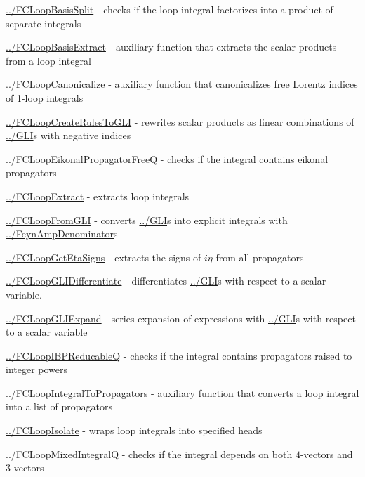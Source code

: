 \documentclass[../FeynCalcManual.tex]{subfiles}
\begin{document}
\begin{itemize}
{\item
  \hyperlink{../fcloopbasissplit}{../FCLoopBasisSplit} - checks if the
  loop integral factorizes into a product of separate integrals
\item
  \hyperlink{../fcloopbasisextract}{../FCLoopBasisExtract} - auxiliary
  function that extracts the scalar products from a loop integral
\item
  \hyperlink{../fcloopcanonicalize}{../FCLoopCanonicalize} - auxiliary
  function that canonicalizes free Lorentz indices of 1-loop integrals
\item
  \hyperlink{../fcloopcreaterulestogli}{../FCLoopCreateRulesToGLI} -
  rewrites scalar products as linear combinations of
  \hyperlink{../gli}{../GLI}s with negative indices
\item
  \hyperlink{../fcloopeikonalpropagatorfreeq}{../FCLoopEikonalPropagatorFreeQ}
  - checks if the integral contains eikonal propagators
\item
  \hyperlink{../fcloopextract}{../FCLoopExtract} - extracts loop
  integrals
\item
  \hyperlink{../fcloopfromgli}{../FCLoopFromGLI} - converts
  \hyperlink{../gli}{../GLI}s into explicit integrals with
  \hyperlink{../feynampdenominator}{../FeynAmpDenominator}s
\item
  \hyperlink{../fcloopgetetasigns}{../FCLoopGetEtaSigns} - extracts the
  signs of \(i \eta\) from all propagators
\item
  \hyperlink{../fcloopglidifferentiate}{../FCLoopGLIDifferentiate} -
  differentiates \hyperlink{../gli}{../GLI}s with respect to a scalar
  variable.
\item
  \hyperlink{../fcloopgliexpand}{../FCLoopGLIExpand} - series expansion
  of expressions with \hyperlink{../gli}{../GLI}s with respect to a
  scalar variable
\item
  \hyperlink{../fcloopibpreducableq}{../FCLoopIBPReducableQ} - checks if
  the integral contains propagators raised to integer powers
\item
  \hyperlink{../fcloopintegraltopropagators}{../FCLoopIntegralToPropagators}
  - auxiliary function that converts a loop integral into a list of
  propagators
\item
  \hyperlink{../fcloopisolate}{../FCLoopIsolate} - wraps loop integrals
  into specified heads
\item
  \hyperlink{../fcloopmixedintegralq}{../FCLoopMixedIntegralQ} - checks
  if the integral depends on both \(4\)-vectors and \(3\)-vectors
\item
}
\end{itemize}
\end{document}
